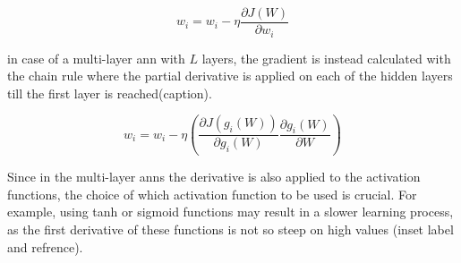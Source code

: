 \documentclass[runningheads]{llncs}
\begin{document}
\begin{equation}
    \label{gdu}
w_{i} = w_{i} - \eta \frac{\partial J(W)}{\partial w_{i}}
\end{equation}

in case of a multi-layer \gls{ann} with $L$ layers, the gradient is instead calculated 
with the chain rule where the partial derivative is applied on each of the hidden layers
till the first layer is reached(caption).

\begin{equation}
    \label{gdu}
w_{i} = w_{i} - \eta (\frac{\partial J(g_{i}(W))}{\partial g_{i}(W)}\frac{\partial g_{i}(W)}{\partial W})
\end{equation}

Since in the multi-layer \gls{anns} the derivative is also applied to the activation functions,
the choice of which activation function to be used is crucial. For example, using 
tanh or sigmoid functions may result in a slower learning process, as the first derivative of these functions
is not so steep on high values (inset label and refrence).
\end{document}
